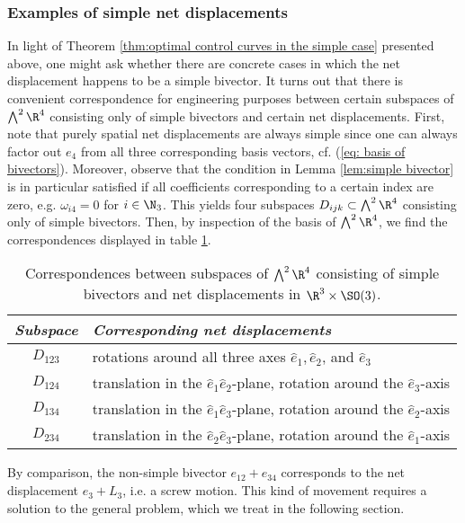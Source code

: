 \subsubsection{Examples of simple net displacements}
In light of Theorem \ref{thm:optimal control curves in the simple case} presented above, one might ask whether there are concrete cases in which the net displacement happens to be a simple bivector. It turns out that there is convenient correspondence for engineering purposes between certain subspaces of $\bigwedge^2 \R^4$ consisting only of simple bivectors and certain net displacements. First, note that purely spatial net displacements are always simple since one can always factor out $e_4$ from all three corresponding basis vectors, cf. (\ref{eq: basis of bivectors}). Moreover, observe that the condition in Lemma \ref{lem:simple bivector} is in particular satisfied if all coefficients corresponding to a certain index are zero, e.g. $\omega_{i4} = 0$ for $i \in \N_3$. This yields four subspaces $D_{ijk} \subset \bigwedge^2 \R^4$ consisting only of simple bivectors. Then, by inspection of the basis of $\bigwedge^2 \R^4$, we find the correspondences displayed in table \ref{tab:simple net displacements}.
\begin{table}[h]
    \centering
        \begin{tabular}{cl}
        \toprule 
        \textit{Subspace} & \textit{Corresponding net displacements} \\ 
        \midrule 
        $D_{123}$ & rotations around all three axes  $\hat{e}_1, \hat{e}_2$, and $\hat{e}_3$ \\ 
        $D_{124}$ & translation in the $\hat{e}_1\hat{e}_2$-plane, rotation around the $\hat{e}_3$-axis \\ 
        $D_{134}$ & translation in the $\hat{e}_1\hat{e}_3$-plane, rotation around the $\hat{e}_2$-axis  \\ 
        $D_{234}$ & translation in the $\hat{e}_2\hat{e}_3$-plane, rotation around the $\hat{e}_1$-axis  \\ 
        \bottomrule 
        \end{tabular} 
    \caption{Correspondences between subspaces of $\bigwedge^2 \R^4$ consisting of simple bivectors and net displacements in $\R^3\times \SO(3)$.}
    \label{tab:simple net displacements}
\end{table}

By comparison, the non-simple bivector $e_{12} + e_{34}$ corresponds to the net displacement $e_3 + L_3$, i.e. a screw motion. This kind of movement requires a solution to the general problem, which we treat in the following section.


